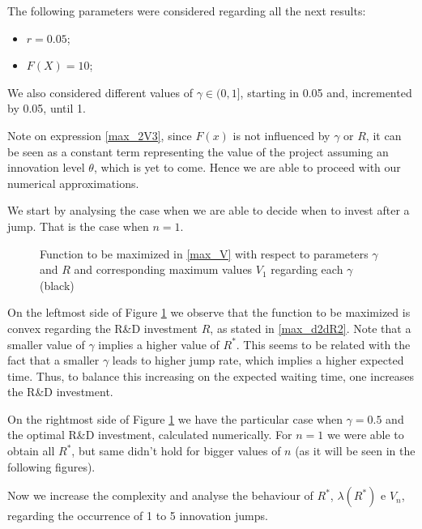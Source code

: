 The following parameters were considered regarding all the next results:
\begin{itemize}
	\item $r=0.05$;
	\item $F(X)=10$;
\end{itemize}
We also considered different values of $\gamma \in (0,1]$, starting in 0.05 and, incremented by 0.05, until 1.

Note on expression \eqref{max_2V3}, since $F(x)$ is not influenced by $\gamma$ or $R$, it can be seen as a constant term representing the value of the project assuming an innovation level $\theta$, which is yet to come. Hence we are able to proceed with our numerical approximations.

We start by analysing the case when we are able to decide when to invest after a jump. That is the case when $n=1$.

\begin{figure}[!htb]
	\begin{subfigmatrix}{2}
		\subfigure[$R \in {(0,1]} $ and $\gamma \in {(0,1]} $. ]{\texttt{[image: Jumps/RgammaV.pdf]}}
	\end{subfigmatrix}
	\caption{Function to be maximized in \eqref{max_V} with respect to parameters $\gamma$ and $R$ and corresponding maximum values $V_1$ regarding each $\gamma$ (black)}
	\label{fig:max_n1}
\end{figure}

On the leftmost side of Figure \ref{fig:max_n1} we observe that the function to be maximized is convex regarding the R\&D investment $R$, as stated in \eqref{max_d2dR2}. Note that a smaller value of $\gamma$ implies a higher value of $R^*$. This seems to be related with the fact that a smaller $\gamma$ leads to higher jump rate, which implies a higher expected time. Thus, to balance this increasing on the expected waiting time, one increases the R\&D investment.

On the rightmost side of Figure \ref{fig:max_n1} we have the particular case when $\gamma=0.5$ and the optimal R\&D investment, calculated numerically. For $n=1$ we were able to obtain all $R^*$, but same didn't hold for bigger values of $n$ (as it will be seen in the following figures).

Now we increase the complexity and analyse the behaviour of $R^*$, $\lambda(R^*)$ e $V_n$, regarding the occurrence of 1 to 5 innovation jumps.

